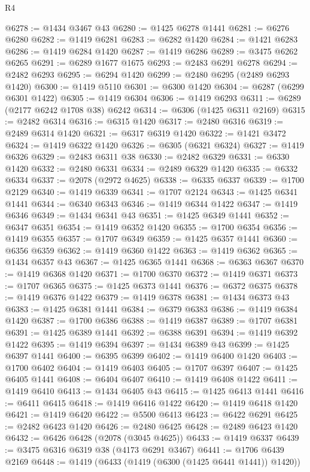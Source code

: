 \begin{lexlean}{R4}
\begin{coremodule}
@6278 := @1434 @3467 @43
@6280 := @1425 @6278 @1441
@6281 := @6276 @6280
@6282 := @1419 @6281
@6283 := @6282 @1420
@6284 := @1421 @6283
@6286 := @1419 @6284 @1420
@6287 := @1419 @6286
@6289 := @3475 @6262 @6265
@6291 := @6289 @1677 @1675
@6293 := @2483 @6291 @6278
@6294 := @2482 @6293
@6295 := @6294 @1420
@6299 := @2480 @6295 (@2489 @6293 @1420)
@6300 := @1419 @5110
@6301 := @6300 @1420
@6304 := @6287 (@6299 @6301 @1422)
@6305 := @1419 @6304
@6306 := @1419 @6293
@6311 := @6289 (@2177 @6242 @1708 @38) @6242
@6314 := @6306 (@1425 @6311 @2169)
@6315 := @2482 @6314
@6316 := @6315 @1420
@6317 := @2480 @6316
@6319 := @2489 @6314 @1420
@6321 := @6317 @6319 @1420
@6322 := @1421 @3472
@6324 := @1419 @6322 @1420
@6326 := @6305 (@6321 @6324)
@6327 := @1419 @6326
@6329 := @2483 @6311 @38
@6330 := @2482 @6329
@6331 := @6330 @1420
@6332 := @2480 @6331
@6334 := @2489 @6329 @1420
@6335 := @6332 @6334
@6337 := @2078 (@2972 @4625)
@6338 := @6335 @6337
@6339 := @1700 @2129
@6340 := @1419 @6339
@6341 := @1707 @2124
@6343 := @1425 @6341 @1441
@6344 := @6340 @6343
@6346 := @1419 @6344 @1422
@6347 := @1419 @6346
@6349 := @1434 @6341 @43
@6351 := @1425 @6349 @1441
@6352 := @6347 @6351
@6354 := @1419 @6352 @1420
@6355 := @1700 @6354
@6356 := @1419 @6355
@6357 := @1707 @6349
@6359 := @1425 @6357 @1441
@6360 := @6356 @6359
@6362 := @1419 @6360 @1422
@6363 := @1419 @6362
@6365 := @1434 @6357 @43
@6367 := @1425 @6365 @1441
@6368 := @6363 @6367
@6370 := @1419 @6368 @1420
@6371 := @1700 @6370
@6372 := @1419 @6371
@6373 := @1707 @6365
@6375 := @1425 @6373 @1441
@6376 := @6372 @6375
@6378 := @1419 @6376 @1422
@6379 := @1419 @6378
@6381 := @1434 @6373 @43
@6383 := @1425 @6381 @1441
@6384 := @6379 @6383
@6386 := @1419 @6384 @1420
@6387 := @1700 @6386
@6388 := @1419 @6387
@6389 := @1707 @6381
@6391 := @1425 @6389 @1441
@6392 := @6388 @6391
@6394 := @1419 @6392 @1422
@6395 := @1419 @6394
@6397 := @1434 @6389 @43
@6399 := @1425 @6397 @1441
@6400 := @6395 @6399
@6402 := @1419 @6400 @1420
@6403 := @1700 @6402
@6404 := @1419 @6403
@6405 := @1707 @6397
@6407 := @1425 @6405 @1441
@6408 := @6404 @6407
@6410 := @1419 @6408 @1422
@6411 := @1419 @6410
@6413 := @1434 @6405 @43
@6415 := @1425 @6413 @1441
@6416 := @6411 @6415
@6418 := @1419 @6416 @1422
@6420 := @1419 @6418 @1420
@6421 := @1419 @6420
@6422 := @5500 @6413
@6423 := @6422 @6291
@6425 := @2482 @6423 @1420
@6426 := @2480 @6425
@6428 := @2489 @6423 @1420
@6432 := @6426 @6428 (@2078 (@3045 @4625))
@6433 := @1419 @6337
@6439 := @3475 @6316 @6319 @38 (@4173 @6291 @3467)
@6441 := @1706 @6439 @2169
@6448 := @1419 (@6433 (@1419 (@6300 (@1425 @6441 @1441)) @1420))

\end{coremodule}
\end{lexlean}
